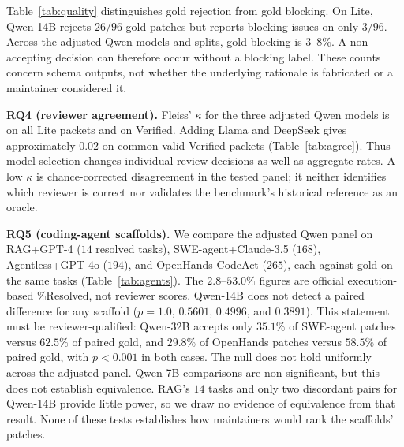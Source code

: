 \documentclass[10pt,conference]{IEEEtran}
\begin{document}
Table~\ref{tab:quality} distinguishes gold rejection from gold blocking. On Lite, Qwen-14B
rejects $26/96$ gold patches but reports blocking issues on only $3/96$. Across the adjusted
Qwen models and splits, gold blocking is $3$--$8\%$. A non-accepting decision can therefore
occur without a blocking label. These counts concern schema outputs, not whether the
underlying rationale is fabricated or a maintainer considered it.

\textbf{RQ4 (reviewer agreement).} Fleiss' $\kappa$ for the three adjusted Qwen models is
\fleissAllLite{} on all Lite packets and \fleissAllVerified{} on Verified. Adding Llama and
DeepSeek gives approximately $0.02$ on common valid Verified packets
(Table~\ref{tab:agree}). Thus model selection changes individual review decisions as well
as aggregate rates. A low $\kappa$ is chance-corrected disagreement in the tested panel;
it neither identifies which reviewer is correct nor validates the benchmark's historical
reference as an oracle.

\begin{table}[t]
\centering
\caption{Inter-reviewer agreement (Fleiss $\kappa$) on common valid packets. The five-reviewer panel includes Qwen, Llama, and DeepSeek; $a/g$ denote agent/gold.}
\label{tab:agree}
\small

\end{table}





\textbf{RQ5 (coding-agent scaffolds).} We compare the adjusted Qwen panel on RAG+GPT-4
($14$ resolved tasks), SWE-agent+Claude-3.5 ($168$), Agentless+GPT-4o ($194$), and
OpenHands-CodeAct ($265$), each against gold on the same tasks (Table~\ref{tab:agents}).
The $2.8$--$53.0\%$ figures are official execution-based \%Resolved, not reviewer scores.
Qwen-14B does not detect a paired difference for any scaffold ($p=1.0$, $0.5601$,
$0.4996$, and $0.3891$). This statement must be reviewer-qualified: Qwen-32B accepts only
$35.1\%$ of SWE-agent patches versus $62.5\%$ of paired gold, and $29.8\%$ of OpenHands
patches versus $58.5\%$ of paired gold, with $p<0.001$ in both cases. The null does not
hold uniformly across the adjusted panel. Qwen-7B comparisons are non-significant, but
this does not establish equivalence. RAG's $14$ tasks and only two discordant pairs for
Qwen-14B provide little power, so we draw no evidence of equivalence from that result.
None of these tests establishes how maintainers would rank the scaffolds' patches.
\end{document}
